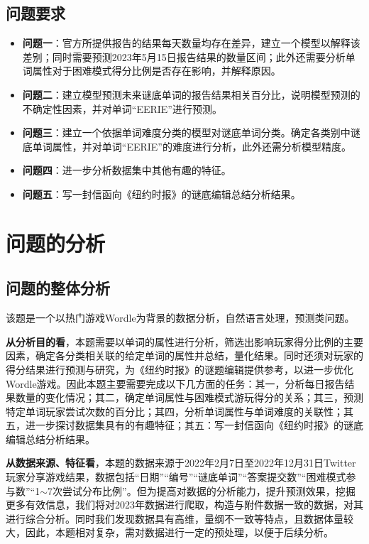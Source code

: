 \documentclass{MathModeling}
\begin{document}
	\subsection{问题要求}
	\begin{itemize}
		\item \textbf{问题一}：官方所提供报告的结果每天数量均存在差异，建立一个模型以解释该差别；同时需要预测2023年5月15日报告结果的数量区间；此外还需要分析单词属性对于困难模式得分比例是否存在影响，并解释原因。
		\item \textbf{问题二}：建立模型预测未来谜底单词的报告结果相关百分比，说明模型预测的不确定性因素，并对单词“EERIE”进行预测。
		\item \textbf{问题三}：建立一个依据单词难度分类的模型对谜底单词分类。确定各类别中谜底单词属性，并对单词“EERIE”的难度进行分析，此外还需分析模型精度。
		\item \textbf{问题四}：进一步分析数据集中其他有趣的特征。
		\item \textbf{问题五}：写一封信函向《纽约时报》的谜底编辑总结分析结果。
	\end{itemize}

	\section{问题的分析}
	\subsection{问题的整体分析}
	该题是一个以热门游戏Wordle为背景的数据分析，自然语言处理，预测类问题。

	\textbf{从分析目的看}，本题需要以单词的属性进行分析，筛选出影响玩家得分比例的主要因素，确定各分类相关联的给定单词的属性并总结，量化结果。同时还须对玩家的得分结果进行预测与研究，为《纽约时报》的谜题编辑提供参考，以进一步优化Wordle游戏。因此本题主要需要完成以下几方面的任务：{\heiti 其一}，分析每日报告结果数量的变化情况；{\heiti 其二}，确定单词属性与困难模式游玩得分的关系；{\heiti 其三}，预测特定单词玩家尝试次数的百分比；{\heiti 其四}，分析单词属性与单词难度的关联性；{\heiti 其五}，进一步探讨数据集具有的有趣特征；{\heiti 其五}：写一封信函向《纽约时报》的谜底编辑总结分析结果。

	\textbf{从数据来源、特征看}，本题的数据来源于2022年2月7日至2022年12月31日Twitter玩家分享游戏结果，数据包括“日期”“编号”“谜底单词”“答案提交数”“困难模式参与数”“1$\sim$7次尝试分布比例”。但为提高对数据的分析能力，提升预测效果，挖掘更多有效信息，我们将对2023年数据进行爬取，构造与附件数据一致的数据，对其进行综合分析。同时我们发现数据具有高维，量纲不一致等特点，且数据体量较大，因此，本题相对复杂，需对数据进行一定的预处理，以便于后续分析。
\end{document}
